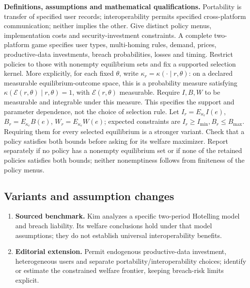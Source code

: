\documentclass[11pt,a4paper]{article}
\begin{document}
\textbf{Definitions, assumptions and mathematical qualifications.} Portability is transfer of specified user records; interoperability permits specified cross-platform communication; neither implies the other. Give distinct policy menus, implementation costs and security-investment constraints. A complete two-platform game specifies user types, multi-homing rules, demand, prices, productive-data investments, breach probabilities, losses and timing. Restrict policies to those with nonempty equilibrium sets and fix a supported selection kernel. More explicitly, for each fixed \(\theta\), write \(\kappa_r=\kappa(\cdot\mid r,\theta)\): on a declared measurable equilibrium-outcome space, this is a probability measure satisfying \(\kappa(\mathcal E(r,\theta)\mid r,\theta)=1\), with \(\mathcal E(r,\theta)\) measurable. Require \(I,B,W\) to be measurable and integrable under this measure. This specifies the support and parameter dependence, not the choice of selection rule. Let \(I_r=E_{\kappa_r}I(e)\), \(B_r=E_{\kappa_r}B(e)\), \(W_r=E_{\kappa_r}W(e)\); expected constraints are \(I_r\geq I_{\min},B_r\leq B_{\max}\). Requiring them for every selected equilibrium is a stronger variant. Check that a policy satisfies both bounds before asking for its welfare maximizer. Report separately if no policy has a nonempty equilibrium set or if none of the retained policies satisfies both bounds; neither nonemptiness follows from finiteness of the policy menus.
\subsection*{Variants and assumption changes}
\begin{enumerate}
\item \textbf{Sourced benchmark.} Kim analyzes a specific two-period Hotelling model and breach liability. Its welfare conclusions hold under that model assumptions; they do not establish universal interoperability benefits.
\item \textbf{Editorial extension.} Permit endogenous productive-data investment, heterogeneous users and separate portability/interoperability choices; identify or estimate the constrained welfare frontier, keeping breach-risk limits explicit.
\end{enumerate}
\end{document}
